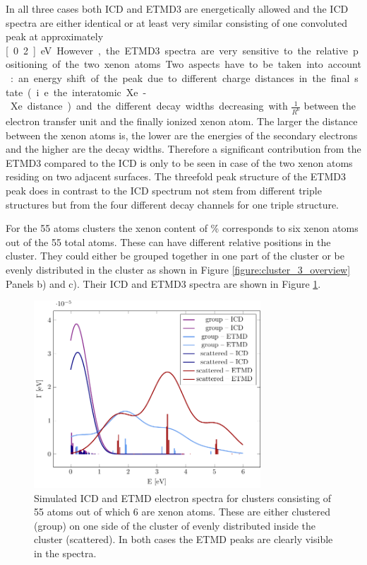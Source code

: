 In all three cases both ICD and ETMD3 are energetically allowed and the ICD
spectra are either identical or at least very similar consisting of one
convoluted peak at approximately \unit[0.2]{eV}. However, the ETMD3 spectra
are very sensitive to the relative positioning of the two xenon atoms.
Two aspects have to be taken into account: an energy shift of the peak due
to different charge distances in the final state (i.e. the interatomic Xe-Xe
distance) and the different decay widths decreasing with $\frac{1}{R^6}$
between the electron transfer unit and the finally ionized xenon atom.
The larger the distance between the xenon atoms is, the lower are the energies
of the secondary electrons and the higher are the decay widths. Therefore a
significant contribution from the ETMD3 compared to the ICD is only
to be seen in case of the two xenon atoms residing on two adjacent
surfaces. The threefold peak structure of the ETMD3 peak does in contrast to
the ICD spectrum not stem from different triple structures but from the
four different decay channels for one triple structure.


For the 55 atoms clusters the xenon content of \unit[10--12]{\%}
corresponds to six xenon atoms out of the 55 total atoms. These can have
different relative positions in the cluster. They could either be grouped
together in one part of the cluster or be evenly distributed in the cluster
as shown in Figure \ref{figure:cluster_3_overview} Panels b) and c). Their
ICD and ETMD3 spectra are shown in Figure \ref{figure:ar_3_6in}.

\begin{figure}[h]
 \centering
 \includegraphics[width=8.5cm]{pics/ar_3_6in.pdf}
 \caption{Simulated ICD and ETMD electron spectra for clusters consisting of
          55 atoms out of which 6 are xenon atoms. These are either clustered
          (group) on one side of the cluster of evenly distributed
          inside the cluster (scattered). In both cases the ETMD peaks are
          clearly visible in the spectra.}
 \label{figure:ar_3_6in}
\end{figure}

